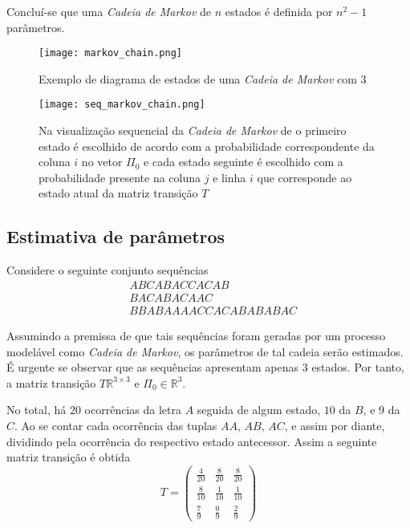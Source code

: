 \documentclass{subfiles}
\begin{document}
Concluí-se que uma \textit{Cadeia de Markov} de $n$ estados é definida por $n^2-1$ parâmetros.

\begin{figure}
	\texttt{[image: markov\_chain.png]}
	\caption{Exemplo de diagrama de estados de uma \textit{Cadeia de Markov} com $3$}
	\label{fig:auto_rep}
\end{figure}

\begin{figure*}[h]
    \texttt{[image: seq\_markov\_chain.png]}
    \caption{Na visualização sequencial da \textit{Cadeia de Markov} de o primeiro estado é escolhido de acordo com a probabilidade correspondente da coluna $i$ no vetor $\Pi_0$ e cada estado seguinte é escolhido com a probabilidade presente na coluna $j$ e linha $i$ que corresponde ao estado atual da matriz transição $T$}
    \label{fig:seq_mc}
\end{figure*}

\subsection{Estimativa de parâmetros} \label{sub:exemplo}

Considere o seguinte conjunto sequências
\begin{align*}
	&ABCABACCACAB         \\
	&BACABACAAC           \\
	&BBABAAAACCACABABABAC
\end{align*}

Assumindo a premissa de que tais sequências foram geradas por um processo modelável como \textit{Cadeia de Markov}, os parâmetros de tal cadeia serão estimados. É urgente se observar que as sequências apresentam apenas $3$ estados. Por tanto, a matriz transição $T \mathbb{R}^{3 \times 3}$ e $\Pi_0 \in \mathbb{R}^3$.

No total, há $20$ ocorrências da letra $A$ seguida de algum estado, $10$ da $B$, e $9$ da $C$. Ao se contar cada ocorrência das tuplas $AA$, $AB$, $AC$, e assim por diante, dividindo pela ocorrência do respectivo estado antecessor. Assim a seguinte matriz transição é obtida
\[
    T = \begin{pmatrix}
        \frac{4}{20} & \frac{8}{20} & \frac{8}{20} \\
        \frac{8}{10} & \frac{1}{10} & \frac{1}{10} \\
        \frac{7}{9} & \frac{0}{9} & \frac{2}{9}
    \end{pmatrix}
\]
\end{document}
